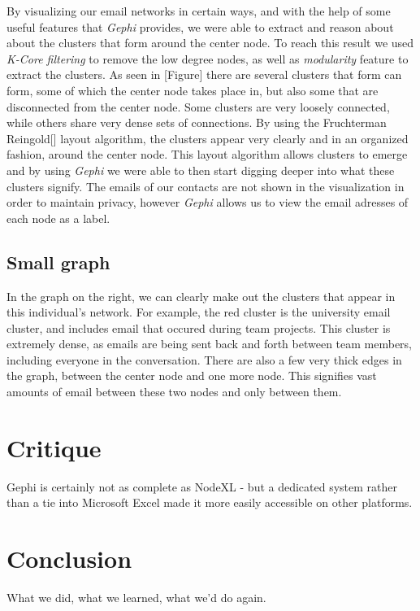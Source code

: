 \documentclass[11pt,letterpaper]{article}
\begin{document}
By visualizing our email networks in certain ways, and with the help of some useful features that \textit{Gephi} provides, we were able to extract and reason about about the clusters that form around the center node. To reach this result we used \textit{K-Core filtering} to remove the low degree nodes, as well as \textit{modularity} feature to extract the clusters. As seen in [Figure] there are several clusters that form can form, some of which the center node takes place in, but also some that are disconnected from the center node. Some clusters are very loosely connected, while others share very dense sets of connections. By using the Fruchterman Reingold[] layout algorithm, the clusters appear very clearly and in an organized fashion, around the center node. This layout algorithm allows clusters to emerge and by using \textit{Gephi} we were able to then start digging deeper into what these clusters signify. The emails of our contacts are not shown in the visualization in order to maintain privacy, however \textit{Gephi} allows us to view the email adresses of each node as a label.

\subsection*{Small graph}
In the graph on the right, we can clearly make out the clusters that appear in this individual's network. For example, the red cluster is the university email cluster, and includes email that occured during team projects. This cluster is extremely dense, as emails are being sent back and forth between team members, including everyone in the conversation. There are also a few very thick edges in the graph, between the center node and one more node. This signifies vast amounts of email between these two nodes and only between them.


\section*{Critique}

Gephi is certainly not as complete as NodeXL - but a dedicated system rather than a tie into Microsoft Excel made it more easily accessible on other platforms.

\section*{Conclusion}

What we did, what we learned, what we'd do again.



\end{document}
